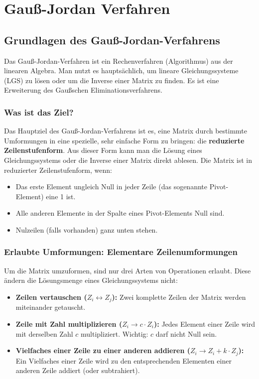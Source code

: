 \chapter{Gauß-Jordan Verfahren}
\label{gauss_jordan_verfahren}

\section{Grundlagen des Gauß-Jordan-Verfahrens}
Das Gauß-Jordan-Verfahren ist ein Rechenverfahren (Algorithmus) aus der linearen Algebra. Man nutzt es hauptsächlich, um lineare Gleichungssysteme (LGS) zu lösen oder um die Inverse einer Matrix zu finden. Es ist eine Erweiterung des Gaußschen Eliminationsverfahrens.

\subsection{Was ist das Ziel?}
Das Hauptziel des Gauß-Jordan-Verfahrens ist es, eine Matrix durch bestimmte Umformungen in eine spezielle, sehr einfache Form zu bringen: die \textbf{reduzierte Zeilenstufenform}. Aus dieser Form kann man die Lösung eines Gleichungssystems oder die Inverse einer Matrix direkt ablesen.
Die Matrix ist in reduzierter Zeilenstufenform, wenn:
\begin{itemize}
    \item Das erste Element ungleich Null in jeder Zeile (das sogenannte Pivot-Element) eine 1 ist.
    \item Alle anderen Elemente in der Spalte eines Pivot-Elements Null sind.
    \item Nulzeilen (falls vorhanden) ganz unten stehen.
\end{itemize}

\subsection{Erlaubte Umformungen: Elementare Zeilenumformungen}
Um die Matrix umzuformen, sind nur drei Arten von Operationen erlaubt. Diese ändern die Lösungsmenge eines Gleichungssystems nicht:
\begin{itemize}
    \item \textbf{Zeilen vertauschen ($Z_i \leftrightarrow Z_j$):} Zwei komplette Zeilen der Matrix werden miteinander getauscht.
    \item \textbf{Zeile mit Zahl multiplizieren ($Z_i \rightarrow c \cdot Z_i$):} Jedes Element einer Zeile wird mit derselben Zahl $c$ multipliziert. Wichtig: $c$ darf nicht Null sein.
    \item \textbf{Vielfaches einer Zeile zu einer anderen addieren ($Z_i \rightarrow Z_i + k \cdot Z_j$):} Ein Vielfaches einer Zeile wird zu den entsprechenden Elementen einer anderen Zeile addiert (oder subtrahiert).
\end{itemize}

